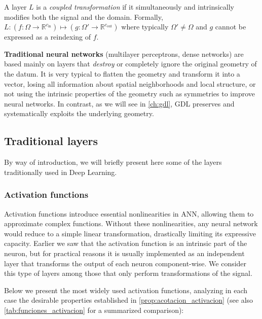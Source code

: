 \begin{definition}\label{def:coupled_transform}
	A layer $L$ is a \textit{coupled transformation} if it simultaneously and intrinsically modifies both the signal and the domain. Formally, $L: (f: \Omega \to \mathbb{R}^{c_{\text{in}}}) \mapsto (g: \Omega' \to \mathbb{R}^{c_{\text{out}}})$ where typically $\Omega' \neq \Omega$ and $g$ cannot be expressed as a reindexing of $f$.
\end{definition}

\textbf{Traditional neural networks} (multilayer perceptrons, dense networks) are based mainly on layers that \textit{destroy} or completely ignore the original geometry of the datum. It is very typical to flatten the geometry and transform it into a vector, losing all information about spatial neighborhoods and local structure, or not using the intrinsic properties of the geometry such as symmetries to improve neural networks. In contrast, as we will see in \autoref{ch:gdl}, \gls{GDL} preserves and systematically exploits the underlying geometry.

\subsection{Traditional layers}

By way of introduction, we will briefly present here some of the layers traditionally used in Deep Learning.

\subsubsection{Activation functions}\label{subsubsec:funciones_activacion_capas}

Activation functions introduce essential nonlinearities in \gls{ANN}, allowing them to approximate complex functions. Without these nonlinearities, any neural network would reduce to a simple linear transformation, drastically limiting its expressive capacity. Earlier we saw that the activation function is an intrinsic part of the neuron, but for practical reasons it is usually implemented as an independent layer that transforms the output of each neuron component-wise. We consider this type of layers among those that only perform transformations of the signal.

Below we present the most widely used activation functions, analyzing in each case the desirable properties established in \autoref{prop:acotacion_activacion} (see also \autoref{tab:funciones_activacion} for a summarized comparison):

